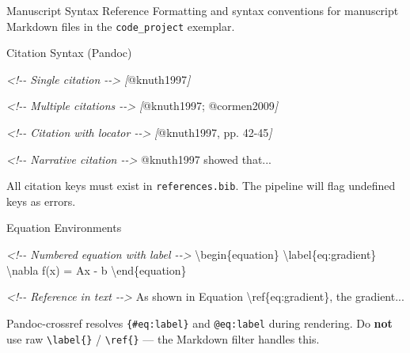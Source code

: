 \documentclass[
  ignorenonframetext,
]{beamer}
\author{\texorpdfstring{}{}}
\date{}
\newenvironment{Shaded}{}{}
\newcommand{\CommentTok}[1]{\textcolor[rgb]{0.38,0.63,0.69}{\textit{#1}}}
\newcommand{\NormalTok}[1]{#1}
\newcommand{\OtherTok}[1]{\textcolor[rgb]{0.00,0.44,0.13}{#1}}
\begin{document}
\begin{frame}[fragile]{Manuscript Syntax Reference}
\protect{}\label{manuscript-syntax-reference}
Formatting and syntax conventions for manuscript Markdown files in the
\texttt{code\_project} exemplar.

\begin{block}{Citation Syntax (Pandoc)}
\protect{}\label{citation-syntax-pandoc}
\begin{Shaded}
\begin{Highlighting}[]
\CommentTok{\textless{}!{-}{-} Single citation {-}{-}\textgreater{}}
\CommentTok{[}\OtherTok{@knuth1997}\CommentTok{]}

\CommentTok{\textless{}!{-}{-} Multiple citations {-}{-}\textgreater{}}
\CommentTok{[}\OtherTok{@knuth1997; @cormen2009}\CommentTok{]}

\CommentTok{\textless{}!{-}{-} Citation with locator {-}{-}\textgreater{}}
\CommentTok{[}\OtherTok{@knuth1997, pp. 42{-}45}\CommentTok{]}

\CommentTok{\textless{}!{-}{-} Narrative citation {-}{-}\textgreater{}}
\NormalTok{@knuth1997 showed that...}
\end{Highlighting}
\end{Shaded}

All citation keys must exist in \texttt{references.bib}. The pipeline
will flag undefined keys as errors.
\end{block}

\begin{block}{Equation Environments}
\protect{}\label{equation-environments}
\begin{Shaded}
\begin{Highlighting}[]
\CommentTok{\textless{}!{-}{-} Numbered equation with label {-}{-}\textgreater{}}
\NormalTok{\textbackslash{}begin\{equation\}}
\NormalTok{\textbackslash{}label\{eq:gradient\}}
\NormalTok{\textbackslash{}nabla f(x) = Ax {-} b}
\NormalTok{\textbackslash{}end\{equation\}}

\CommentTok{\textless{}!{-}{-} Reference in text {-}{-}\textgreater{}}
\NormalTok{As shown in Equation \textbackslash{}ref\{eq:gradient\}, the gradient...}
\end{Highlighting}
\end{Shaded}

Pandoc-crossref resolves \texttt{\{\#eq:label\}} and \texttt{@eq:label}
during rendering. Do \textbf{not} use raw
\texttt{\textbackslash{}label\{\}} / \texttt{\textbackslash{}ref\{\}}
--- the Markdown filter handles this.
\end{block}


\end{frame}
\end{document}
